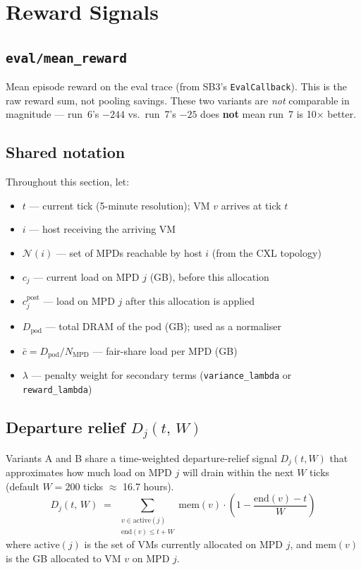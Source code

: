 \documentclass[11pt]{article}
\begin{document}
\section{Reward Signals}

\subsection*{\texttt{eval/mean\_reward}}
Mean episode reward on the eval trace (from SB3's \texttt{EvalCallback}).
This is the raw reward sum, not pooling savings.
These two variants are \emph{not} comparable in magnitude ---
run~6's $-244$ vs.\ run~7's $-25$ does \textbf{not} mean run~7 is 10$\times$ better.

\subsection*{Shared notation}

Throughout this section, let:
\begin{itemize}
  \item $t$ --- current tick (5-minute resolution); VM $v$ arrives at tick $t$
  \item $i$ --- host receiving the arriving VM
  \item $\mathcal{N}(i)$ --- set of MPDs reachable by host $i$ (from the CXL topology)
  \item $c_j$ --- current load on MPD $j$ (GB), before this allocation
  \item $c_j^{\text{post}}$ --- load on MPD $j$ after this allocation is applied
  \item $D_{\text{pod}}$ --- total DRAM of the pod (GB); used as a normaliser
  \item $\bar{c} = D_{\text{pod}} / N_{\text{MPD}}$ --- fair-share load per MPD (GB)
  \item $\lambda$ --- penalty weight for secondary terms (\texttt{variance\_lambda} or \texttt{reward\_lambda})
\end{itemize}

\subsection*{Departure relief $D_j(t,\,W)$}

Variants A and B share a time-weighted departure-relief signal $D_j(t, W)$
that approximates how much load on MPD $j$ will drain within the next $W$ ticks
(default $W = 200$ ticks $\approx$ 16.7 hours).
\begin{equation}
  D_j(t,\,W)
  \;=\;
  \sum_{\substack{v \in \text{active}(j) \\ \text{end}(v) \leq t + W}}
  \!\!
  \text{mem}(v)
  \cdot
  \left(1 - \frac{\text{end}(v) - t}{W}\right)
  \label{eq:Dj}
\end{equation}
where $\text{active}(j)$ is the set of VMs currently allocated on MPD $j$,
and $\text{mem}(v)$ is the GB allocated to VM $v$ on MPD $j$.
\end{document}
